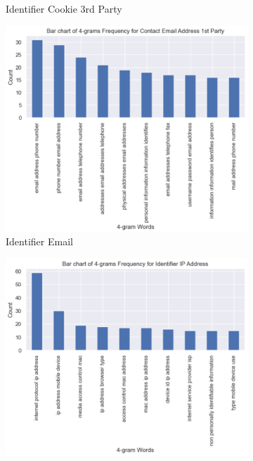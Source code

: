\begin{figure}[!ht]
\begin{subfigure}[t]{.5\textwidth}
	  \caption{Identifier Cookie 3rd Party}
	\end{subfigure}
	
	\medskip
  
	\begin{subfigure}[t]{.5\textwidth}
	  \centering
	  \includegraphics[width=\linewidth]{figures/4_grams_email.png}
	  \caption{Identifier Email}
	\end{subfigure}
	\hfill
	\begin{subfigure}[t]{.5\textwidth}
	  \centering
	  \includegraphics[width=\linewidth]{figures/4_grams_ip_address.png}

\end{subfigure}
\end{figure}
